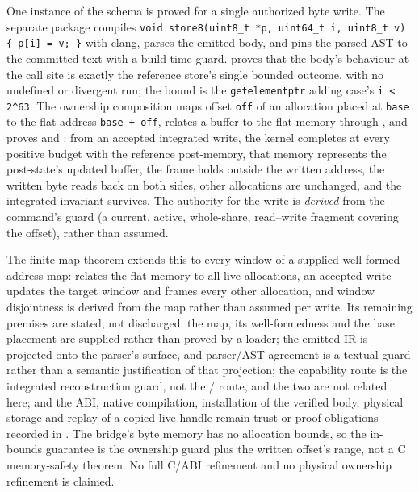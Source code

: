 \documentclass[a4paper,UKenglish,cleveref]{lipics-v2021}
\begin{document}
One instance of the schema is proved for a single authorized byte write. The
separate  package compiles
\texttt{void store8(uint8\_t *p, uint64\_t i, uint8\_t v) \{ p[i] = v; \}} with
clang, parses the emitted body, and pins the parsed AST to the committed text
with a build-time guard.  proves that the body's
behaviour at the call site is exactly the reference store's single bounded
outcome, with no undefined or divergent run; the bound is the
\texttt{getelementptr} adding case's \texttt{i < 2\textasciicircum 63}. The
ownership composition maps offset \texttt{off} of an allocation placed at
\texttt{base} to the flat address \texttt{base + off}, relates a buffer to the
flat memory through , and proves
 and : from an
accepted integrated write, the kernel completes at every positive budget with
the reference post-memory, that memory represents the post-state's updated
buffer, the frame holds outside the written address, the written byte reads back
on both sides, other allocations are unchanged, and the integrated invariant
survives. The authority for the write is \emph{derived} from the command's guard
(a current, active, whole-share, read--write fragment covering the offset),
rather than assumed.

The finite-map theorem  extends this
to every window of a supplied well-formed address map: 
relates the flat memory to all live allocations, an accepted write updates the
target window and frames every other allocation, and window disjointness is
derived from the map rather than assumed per write. Its remaining premises are
stated, not discharged: the map, its well-formedness and the base placement are
supplied rather than proved by a loader; the emitted IR is projected
onto the parser's surface, and parser/AST agreement is a textual guard rather
than a semantic justification of that projection; the capability route is the
integrated reconstruction guard, not the 
/ route, and the two are not related here; and the ABI,
native compilation, installation of the verified body, physical storage and
replay of a copied live handle remain trust or proof obligations recorded in
. The bridge's byte memory has no allocation
bounds, so the in-bounds guarantee is the ownership guard plus the written
offset's range, not a C memory-safety theorem. No full C/ABI refinement and no
physical ownership refinement is claimed.
\end{document}
